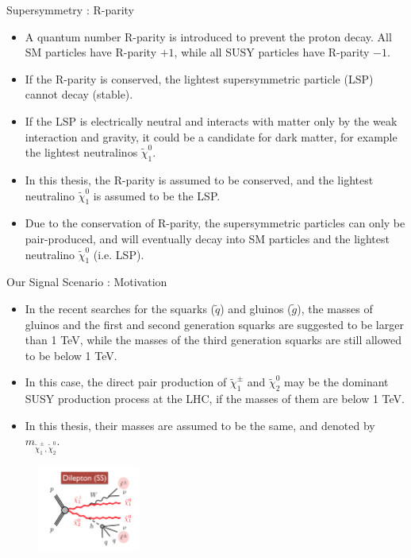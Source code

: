 \documentclass[mathserif,serif]{beamer}
\begin{document}
\begin{frame}{Supersymmetry : R-parity}
\begin{itemize}
\item A quantum number R-parity is introduced to prevent the proton decay. All SM particles have R-parity $+1$, while all SUSY particles have R-parity $-1$.
\item If the R-parity is conserved, the lightest supersymmetric particle (LSP) cannot decay (stable).
\item If the LSP is electrically neutral and interacts with matter only by the weak interaction and gravity, it could be a candidate for dark matter, for example the lightest neutralinos $\tilde{\chi}_1^0$.
\item In this thesis, the R-parity is assumed to be conserved, and the lightest neutralino $\tilde{\chi}_1^0$ is assumed to be the LSP.
\item Due to the conservation of R-parity, the supersymmetric particles can only be pair-produced, and will eventually decay into SM particles and the lightest neutralino $\tilde{\chi}_1^0$ (i.e. LSP).
\end{itemize}
\end{frame}

\begin{frame}{Our Signal Scenario : Motivation}
\begin{itemize}
\item In the recent searches for the squarks ($\tilde{q}$) and gluinos ($\tilde{g}$), the masses of gluinos and the first and second generation squarks are suggested to be larger than 1 TeV, while the masses of the third generation squarks are still allowed to be below 1 TeV.
\item In this case, the direct pair production of $\tilde{\chi}_1^\pm$  and $\tilde{\chi}_2^0$ may be the dominant SUSY production process at the LHC, if the masses of them are below 1 TeV.
\item In this thesis, their masses are assumed to be the same, and denoted by $m_{\tilde{\chi}_1^\pm , \tilde{\chi}_2^0}$.
\end{itemize}
\begin{figure}
\centering
\includegraphics[width=0.3\textwidth]{data/photo/theory/signal_feynman.png}
\end{figure}
\end{frame}
\end{document}
